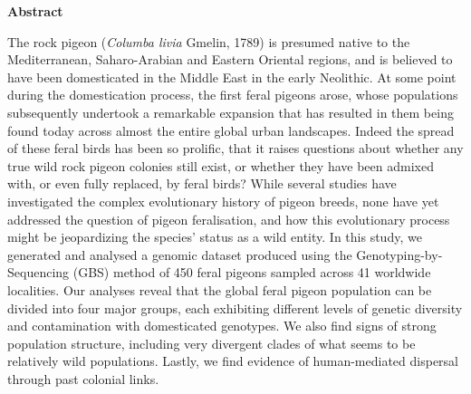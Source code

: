 \documentclass[twoside, british, a4paper]{article}
\begin{document}

\hfill\break
\hfill\break
\hfill\break

\begin{center}
\noindent \bfseries \large {} Abstract \\
\end{center}

 \small \noindent
The rock pigeon (\textit{Columba livia} Gmelin, 1789) is presumed native to the Mediterranean, Saharo-Arabian and Eastern Oriental regions, and is believed to have been domesticated in the Middle East in the early Neolithic. At some point during the domestication process, the first feral pigeons arose, whose populations subsequently undertook a remarkable expansion that has resulted in them being found today across almost the entire global urban landscapes. Indeed the spread of these feral birds has been so prolific, that it raises questions about whether any true wild rock pigeon colonies still exist, or whether they have been admixed with, or even fully replaced, by feral birds? While several studies have investigated the complex evolutionary history of pigeon breeds, none have yet addressed the question of pigeon feralisation, and how this evolutionary process might be jeopardizing the species’ status as a wild entity. In this study, we generated and analysed a genomic dataset produced using the Genotyping-by-Sequencing (GBS) method of 450 feral pigeons sampled across 41 worldwide localities. Our analyses reveal that the global feral pigeon population can be divided into four major groups, each exhibiting different levels of genetic diversity and contamination with domesticated genotypes. We also find signs of strong population structure, including very divergent clades of what seems to be relatively wild populations. Lastly, we find evidence of human-mediated dispersal through past colonial links.\

\newpage

\end{document}
